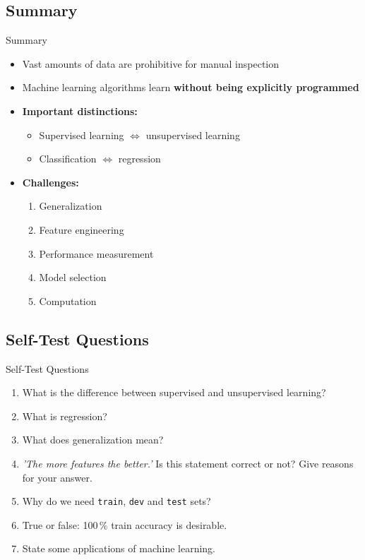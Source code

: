 \subsection{Summary}

\begin{frame}{Summary}{}
	\begin{itemize}
		\item Vast amounts of data are prohibitive for manual inspection
		\item Machine learning algorithms learn \textbf{without being explicitly programmed}
		\item \textbf{Important distinctions:}
		\begin{itemize}
			\item Supervised learning $\Leftrightarrow$ unsupervised learning
			\item Classification $\Leftrightarrow$ regression
		\end{itemize}
		\item \textbf{Challenges:}
		\begin{enumerate}
			\item Generalization
			\item Feature engineering
			\item Performance measurement
			\item Model selection
			\item Computation
		\end{enumerate}
	\end{itemize}
\end{frame}


\subsection{Self-Test Questions}

\begin{frame}{Self-Test Questions}{}\important
	\begin{enumerate}
		\item What is the difference between supervised and unsupervised learning?
		\item What is regression?
		\item What does generalization mean?
		\item \textit{'The more features the better.'} Is this statement correct or not? Give reasons for your answer.
		\item Why do we need \texttt{train}, \texttt{dev} and \texttt{test} sets?
		\item True or false: 100\,\% train accuracy is desirable.
		\item State some applications of machine learning.
	\end{enumerate}
\end{frame}


